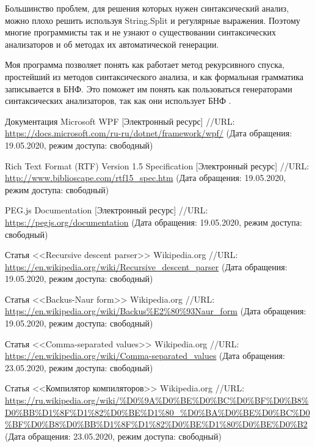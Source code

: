 \documentclass[a4paper,12pt]{article}
\begin{document}
  Большинство проблем, для решения которых нужен синтаксический анализ,
  можно плохо решить используя String.Split и регулярные выражения.
  Поэтому многие программисты так и не узнают о существовании синтаксических анализаторов и об методах их автоматической генерации.

  Моя программа позволяет понять как работает метод рекурсивного спуска, простейший из методов синтаксического анализа,
  и как формальная грамматика записывается в БНФ.
  Это поможет им понять как пользоваться генераторами синтаксических анализаторов, так как они использует БНФ \cite{cc}.

  \begin{CRTbibliography}
    Документация Microsoft WPF [Электронный ресурс] //URL: \url{https://docs.microsoft.com/ru-ru/dotnet/framework/wpf/}
    (Дата обращения: 19.05.2020, режим доступа: свободный)

    Rich Text Format (RTF) Version 1.5 Specification [Электронный ресурс] //URL: \url{http://www.biblioscape.com/rtf15_spec.htm}
    (Дата обращения: 19.05.2020, режим доступа: свободный)

    PEG.js Documentation [Электронный ресурс] //URL: \url{https://pegjs.org/documentation}
    (Дата обращения: 19.05.2020, режим доступа: свободный)

    Статья <<Recursive descent parser>> Wikipedia.org
    //URL: \url{https://en.wikipedia.org/wiki/Recursive_descent_parser}
    (Дата обращения: 19.05.2020, режим доступа: свободный)

    Статья <<Backus-Naur form>> Wikipedia.org
    //URL: \url{https://en.wikipedia.org/wiki/Backus%E2%80%93Naur_form}
    (Дата обращения: 19.05.2020, режим доступа: свободный)

    Статья <<Comma-separated values>> Wikipedia.org
    //URL: \url{https://en.wikipedia.org/wiki/Comma-separated_values}
    (Дата обращения: 23.05.2020, режим доступа: свободный)

    Статья <<Компилятор компиляторов>> Wikipedia.org
    //URL: \url{https://ru.wikipedia.org/wiki/%D0%9A%D0%BE%D0%BC%D0%BF%D0%B8%D0%BB%D1%8F%D1%82%D0%BE%D1%80_%D0%BA%D0%BE%D0%BC%D0%BF%D0%B8%D0%BB%D1%8F%D1%82%D0%BE%D1%80%D0%BE%D0%B2}
    (Дата обращения: 23.05.2020, режим доступа: свободный)


  \end{CRTbibliography}
\end{document}
